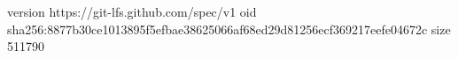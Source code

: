 version https://git-lfs.github.com/spec/v1
oid sha256:8877b30ce1013895f5efbae38625066af68ed29d81256ecf369217eefe04672c
size 511790
